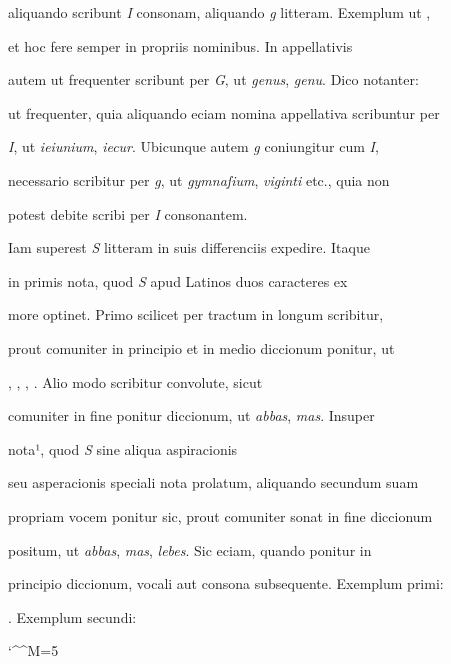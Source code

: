 aliquando scribunt \textit{I} consonam, aliquando \textit{g} litteram. Exemplum ut ,

 et hoc fere semper in propriis nominibus. In appellativis

autem ut frequenter scribunt per \textit{G}, ut \textit{genus}, \textit{genu}. Dico notanter:

ut frequenter, quia aliquando eciam nomina appellativa scribuntur per

\textit{I}, ut \textit{ieiunium}, \textit{iecur}. Ubicunque autem \textit{g} coniungitur cum \textit{I},

necessario scribitur per \textit{g}, ut \textit{gymnaſium}, \textit{viginti} etc., quia non


potest debite scribi per \textit{I} consonantem.


\indentK Iam superest \textit{S} litteram in suis differenciis expedire. Itaque

\fulllines

in primis nota, quod \textit{S} apud Latinos duos caracteres ex

more optinet. Primo scilicet per tractum in longum scribitur,

prout comuniter in principio et in medio diccionum ponitur, ut

, , , . Alio modo scribitur convolute, sicut

comuniter in fine ponitur diccionum, ut \textit{abbas}, \textit{mas}. Insuper

nota¹, quod \textit{S} sine aliqua aspiracionis

seu asperacionis speciali nota prolatum, aliquando secundum suam

propriam vocem ponitur sic, prout comuniter sonat in fine diccionum

positum, ut \textit{abbas}, \textit{mas}, \textit{lebes}. Sic eciam, quando ponitur in

principio diccionum, vocali aut consona subsequente. Exemplum primi: 

    . Exemplum secundi: 

\splitlines

\catcode `\^^M=5
\obeylines

